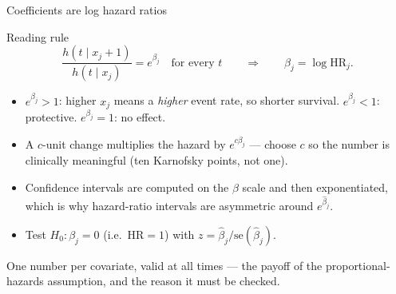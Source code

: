 \documentclass[aspectratio=169,11pt]{beamer}
\begin{document}
\begin{frame}{Coefficients are log hazard ratios}
  \scriptsize
  \begin{block}{Reading rule}
    \[
      \boxed{\;
        \frac{h(t\mid x_j+1)}{h(t\mid x_j)}=e^{\beta_j}
        \quad\text{for every } t
        \qquad\Longrightarrow\qquad
        \beta_j=\log \mathrm{HR}_j . \;}
    \]
  \end{block}
  \begin{readme}
    \begin{itemize}
      \item $e^{\beta_j}>1$: higher $x_j$ means a \emph{higher} event rate, so shorter
            survival. $e^{\beta_j}<1$: protective. $e^{\beta_j}=1$: no effect.
      \item A $c$-unit change multiplies the hazard by $e^{c\beta_j}$ --- choose $c$ so
            the number is clinically meaningful (ten Karnofsky points, not one).
      \item Confidence intervals are computed on the $\beta$ scale and then exponentiated,
            which is why hazard-ratio intervals are asymmetric around $e^{\hat\beta_j}$.
      \item Test $H_0:\beta_j=0$ (i.e.\ $\mathrm{HR}=1$) with $z=\hat\beta_j/
            \mathrm{se}(\hat\beta_j)$.
    \end{itemize}
  \end{readme}
  \begin{takeaway}
    One number per covariate, valid at all times --- the payoff of the
    proportional-hazards assumption, and the reason it must be checked.
  \end{takeaway}
\end{frame}
\end{document}
